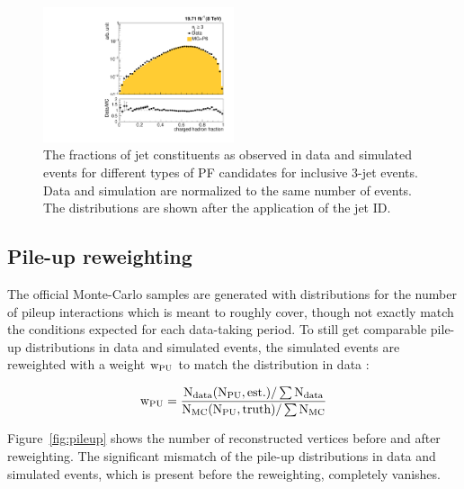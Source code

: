 \begin{figure}[!htbp]
\begin{center}
    \includegraphics[width=0.5\textwidth]{Plots_HT_2_150/Qual/Comparison_ChHadFrac_3_HT_2_150.pdf}%
    \caption{The fractions of jet constituents as observed in data and simulated events for different types of PF candidates for inclusive 3-jet events. Data and simulation are normalized to the same number of events. The distributions are shown after the application of the jet ID.}
    \label{fig:qual3}
  \end{center}
\end{figure} 

\subsection{Pile-up reweighting}
The official Monte-Carlo samples are generated with distributions for the number of pileup interactions which is meant to roughly cover, 
though not exactly match the conditions expected for each data-taking period. To still get comparable pile-up distributions in data and 
simulated events, the simulated events are reweighted with a weight $\rm{ w_{PU}}$ to match the distribution in data :

\begin{equation}
  \rm{w_{PU} = \frac {N_{data} (N_{PU},est.)/\sum N_{data}} {N_{MC} (N_{PU},truth)/\sum N_{MC}}}
\end{equation}

Figure~\ref{fig:pileup} shows the number of reconstructed vertices before and after reweighting. The significant mismatch of the pile-up 
distributions in data and simulated events, which is present before the reweighting, completely vanishes.

